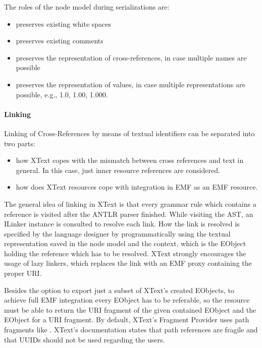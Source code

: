 The roles of the node model during serializations are:
\begin{itemize}
	\item preserves existing white spaces
	\item preserves existing comments
	\item preserves the representation of cross-references, in case multiple names are possible
	\item preserves the representation of values, in case multiple representations are possible, e.g., 1.0, 1.00, 1.000.
\end{itemize}

\paragraph{Linking}
\label{sec:xtextarch:Linking}
Linking of Cross-References by means of textual identifiers can be separated into two parts:
\begin{itemize}
	\item how XText copes with the mismatch between cross references and text in general. In this case, just inner resource references are considered. 
	\item how does XText resources cope with integration in EMF as an EMF resource.
\end{itemize}
The general idea of linking in XText is that every grammar rule which contains a reference is visited after the ANTLR parser  finished. While visiting the AST, an ILinker instance is consulted to resolve each link. How the link is resolved is specified by the language designer by programmatically using the textual representation saved in the node model and the context, which is the EObject holding the reference which has to be resolved. XText strongly encourages the usage of lazy linkers, which replaces the link with an EMF proxy containing the proper URI.

Besides the option to export just a subset of XText's created EObjects, to achieve full EMF integration every EObject has to be referable, so the resource must be able to return the URI fragment of the given contained EObject and the EObject for a URI fragment. By default, XText's Fragment Provider uses path fragments like . XText's documentation states that path references are fragile and that UUIDs should not be used regarding the users. 

